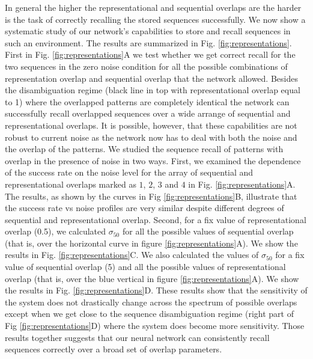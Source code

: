 \documentclass[10pt,a4paper]{article}
\begin{document}
In general the higher the representational and sequential overlaps are the harder is the task of correctly recalling the stored sequences successfully. We now show a systematic study of our network's capabilities to store and recall sequences in such an environment. The results are summarized in Fig. \ref{fig:representations}. First in Fig. \ref{fig:representations}A we test whether we get correct recall for the two sequences in the zero noise condition for all the possible combinations of representation overlap and sequential overlap that the network allowed. Besides the disambiguation regime (black line in top with representational overlap equal to 1) where the overlapped patterns are completely identical the network can successfully recall overlapped sequences over a wide arrange of sequential and representational overlaps. It is possible, however, that these capabilities are not robust to current noise as the network now has to deal with both the noise and the overlap of the patterns. We studied the sequence recall of patterns with overlap in the presence of noise in two ways. First, we examined the dependence of the success rate on the noise level for the array of sequential and representational overlaps marked as $1$, $2$, $3$ and $4$ in Fig. \ref{fig:representations}A. The results, as shown by the curves in Fig \ref{fig:representations}B, illustrate that the success rate vs noise profiles are very similar despite different degrees of sequential and representational overlap. Second, for a fix value of representational overlap (0.5), we calculated $\sigma_{50}$ for all the possible values of sequential overlap (that is, over the horizontal curve in figure \ref{fig:representations}A). We show the results in Fig. \ref{fig:representations}C. We also calculated the values of $\sigma_{50}$ for a fix value of sequential overlap (5) and all the possible values of representational overlap (that is, over the blue vertical in figure \ref{fig:representations}A). We show the results in Fig. \ref{fig:representations}D. These results show that the sensitivity of the system does not drastically change across the spectrum of possible overlaps except when we get close to the sequence disambiguation regime (right part of Fig \ref{fig:representations}D) where the system does become more sensitivity. Those results together suggests that our neural network can consistently recall sequences correctly over a broad set of overlap parameters.  
\end{document}
